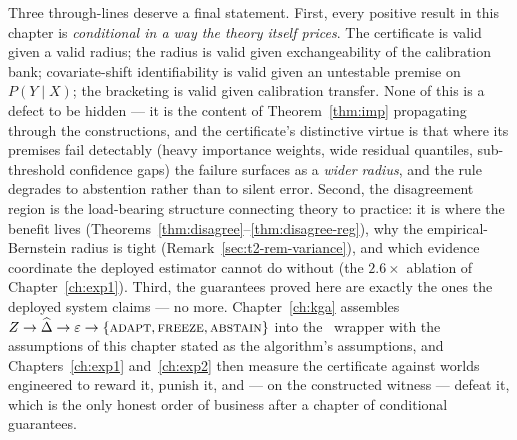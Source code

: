 Three through-lines deserve a final statement. First, every positive result in this
chapter is \emph{conditional in a way the theory itself prices}. The certificate is
valid given a valid radius; the radius is valid given exchangeability of the
calibration bank; covariate-shift identifiability is valid given an untestable premise
on $P(Y\mid X)$; the bracketing is valid given calibration transfer. None of this is a
defect to be hidden --- it is the content of Theorem~\ref{thm:imp} propagating through
the constructions, and the certificate's distinctive virtue is that where its premises
fail detectably (heavy importance weights, wide residual quantiles, sub-threshold
confidence gaps) the failure surfaces as a \emph{wider radius}, and the rule degrades
to abstention rather than to silent error. Second, the disagreement region is the
load-bearing structure connecting theory to practice: it is where the benefit lives
(Theorems~\ref{thm:disagree}--\ref{thm:disagree-reg}), why the empirical-Bernstein
radius is tight (Remark~\ref{sec:t2-rem-variance}), and which evidence coordinate the
deployed estimator cannot do without (the $2.6\times$ ablation of
Chapter~\ref{ch:exp1}). Third, the guarantees proved here are exactly the ones the
deployed system claims --- no more. Chapter~\ref{ch:kga} assembles
$Z\to\widehat\Delta\to\varepsilon\to\{\textsc{adapt},\textsc{freeze},\textsc{abstain}\}$
into the \KGA\ wrapper with the assumptions of this chapter stated as the algorithm's
assumptions, and Chapters~\ref{ch:exp1} and~\ref{ch:exp2} then measure the certificate
against worlds engineered to reward it, punish it, and --- on the constructed witness
--- defeat it, which is the only honest order of business after a chapter of
conditional guarantees.
